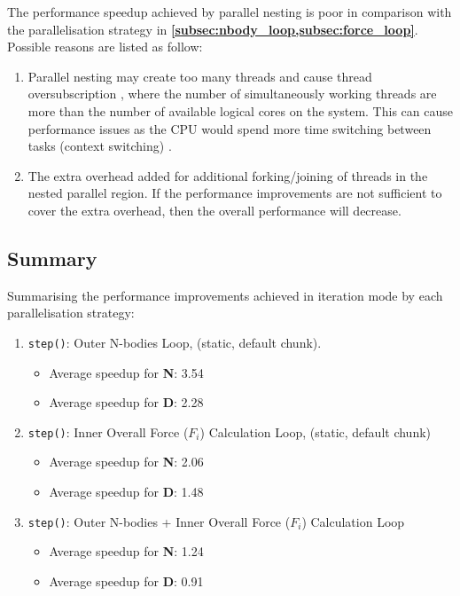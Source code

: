 \documentclass[12pt, a4paper]{article}
\let\oldcref\cref
\renewcommand{\cref}[1]{\textbf{\oldcref{#1}}}
\begin{document}
The performance speedup achieved by parallel nesting is poor in comparison with the parallelisation
strategy in \cref{subsec:nbody_loop,subsec:force_loop}. Possible reasons are listed as follow:
\begin{enumerate}
  \item Parallel nesting may create too many threads and cause thread oversubscription
  \cite{nested_parallelism_tips}, where the number of simultaneously working threads are more than
  the number of available logical cores on the system. This can cause performance issues as the
  CPU would spend more time switching between tasks (context switching)
  \cite{thread_oversubscription}.
  \item The extra overhead added for additional forking/joining of threads in the nested parallel
  region. If the performance improvements are not sufficient to cover the extra overhead, then the
  overall performance will decrease.
\end{enumerate}


\subsection{Summary} \label{subsec:benchmark_summary}
Summarising the performance improvements achieved in iteration mode by each parallelisation strategy:
\begin{enumerate}
  \item \texttt{step()}: Outer N-bodies Loop, (static, default chunk).
    \begin{itemize}
      \item Average speedup for \textbf{N}: 3.54
      \item Average speedup for \textbf{D}: 2.28
    \end{itemize}
  \item \texttt{step()}: Inner Overall Force ($F_i$) Calculation Loop, (static, default chunk)
    \begin{itemize}
      \item Average speedup for \textbf{N}: 2.06
      \item Average speedup for \textbf{D}: 1.48
    \end{itemize}
  \item \texttt{step()}: Outer N-bodies + Inner Overall Force ($F_i$) Calculation Loop
    \begin{itemize}
      \item Average speedup for \textbf{N}: 1.24
      \item Average speedup for \textbf{D}: 0.91
    \end{itemize}
\end{enumerate}
\end{document}
